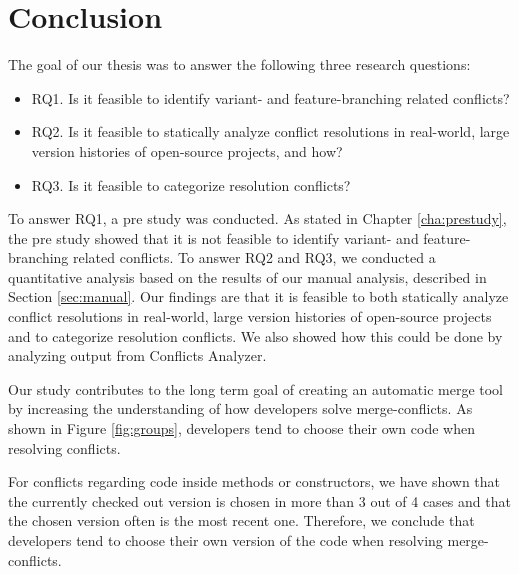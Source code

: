 \chapter{Conclusion}
The goal of our thesis was to answer the following three research questions:
\begin{itemize}
\item RQ1. Is it feasible to identify variant- and feature-branching related conflicts?
\item RQ2. Is it feasible to statically analyze conflict resolutions in real-world, large version histories of open-source projects, and how?
\item RQ3. Is it feasible to categorize resolution conflicts?
\end{itemize}

To answer RQ1, a pre study was conducted. As stated in Chapter \ref{cha:prestudy}, the pre study showed that it is not feasible to identify variant- and feature-branching related conflicts. To answer RQ2 and RQ3, we conducted a quantitative analysis based on the results of our manual analysis, described in Section \ref{sec:manual}. Our findings are that it is feasible to both statically analyze conflict resolutions in real-world, large version histories of open-source projects and to categorize resolution conflicts. We also showed how this could be done by analyzing output from Conflicts Analyzer.

Our study contributes to the long term goal of creating an automatic merge tool by increasing the understanding of how developers solve merge-conflicts. As shown in Figure \ref{fig:groups}, developers tend to choose their own code when resolving conflicts.

For conflicts regarding code inside methods or constructors, we have shown that the currently checked out version is chosen in more than 3 out of 4 cases and that the chosen version often is the most recent one. Therefore, we conclude that developers tend to choose their own version of the code when resolving merge-conflicts.
